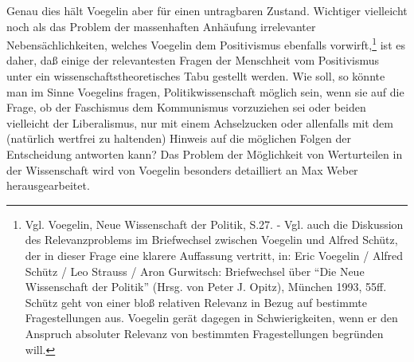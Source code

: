 Genau dies hält Voegelin aber für einen untragbaren Zustand. Wichtiger
vielleicht noch als das Problem der massenhaften Anhäufung irrelevanter
Nebensächlichkeiten, welches Voegelin dem Positivismus ebenfalls
vorwirft,\footnote{Vgl. Voegelin, Neue Wissenschaft der Politik, S.27. - Vgl.
  auch die Diskussion des Relevanzproblems im Briefwechsel zwischen Voegelin
  und Alfred Schütz, der in dieser Frage eine klarere Auf\/fassung vertritt, in:
  Eric Voegelin / Alfred Schütz / Leo Strauss / Aron Gurwitsch: Briefwechsel
  über "`Die Neue Wissenschaft der Politik"' (Hrsg. von Peter J. Opitz),
  München 1993, 55ff. Schütz geht von einer bloß relativen Relevanz in Bezug
  auf bestimmte Fragestellungen aus. Voegelin gerät dagegen in
  Schwierigkeiten, wenn er den Anspruch absoluter Relevanz von bestimmten
  Fragestellungen begründen will.} ist es daher, daß einige der relevantesten
Fragen der Menschheit vom Positivismus unter ein wissenschaftstheoretisches
Tabu gestellt werden. Wie soll, so könnte man im Sinne Voegelins fragen,
Politikwissenschaft möglich sein, wenn sie auf die Frage, ob der Faschismus
dem Kommunismus vorzuziehen sei oder beiden vielleicht der Liberalismus, nur
mit einem Achselzucken oder allenfalls mit dem (natürlich wertfrei zu
haltenden) Hinweis auf die möglichen Folgen der Entscheidung antworten kann?
Das Problem der Möglichkeit von Werturteilen in der Wissenschaft wird von
Voegelin besonders detailliert an Max Weber herausgearbeitet.


